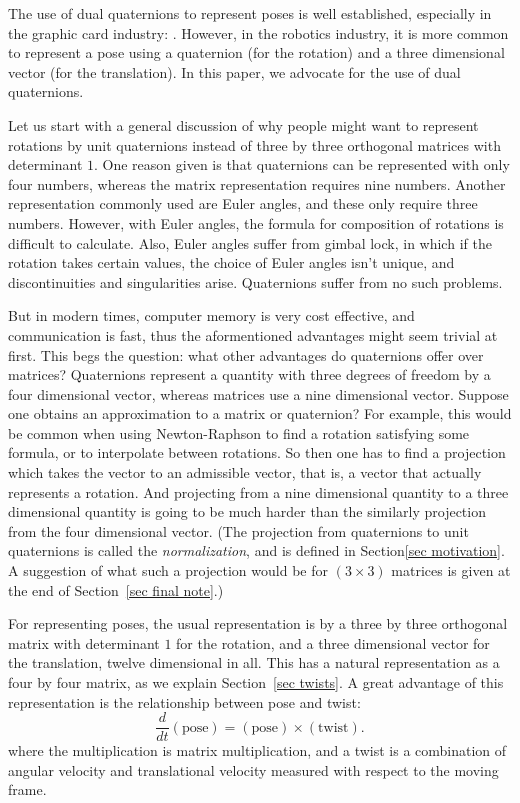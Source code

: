 \documentclass[reqno,12pt]{amsart}
\begin{document}
The use of dual quaternions to represent poses is well established, especially in the graphic card industry: \cite{adorno,han-et-al,clifford,kavan-et-al,kavan-et-al-2,kenwright,wang-et-al}.  However, in the robotics industry, it is more common to represent a pose using a quaternion (for the rotation) and a three dimensional vector (for the translation).  In this paper, we advocate for the use of dual quaternions.

Let us start with a general discussion of why people might want to represent rotations by unit quaternions instead of three by three orthogonal matrices with determinant $1$.  One reason given is that quaternions can be represented with only four numbers, whereas the matrix representation requires nine numbers.  Another representation commonly used are Euler angles, and these only require three numbers.  However, with Euler angles, the formula for composition of rotations is difficult to calculate.  Also, Euler angles suffer from gimbal lock, in which if the rotation takes certain values, the choice of Euler angles isn't unique, and discontinuities and singularities arise.  Quaternions suffer from no such problems.

But in modern times, computer memory is very cost effective, and communication is fast, thus the aformentioned advantages might seem trivial at first.  This begs the question: what other advantages do quaternions offer over matrices?  Quaternions represent a quantity with three degrees of freedom by a four dimensional vector, whereas matrices use a nine dimensional vector.  Suppose one obtains an approximation to a matrix or quaternion?  For example, this would be common when using Newton-Raphson to find a rotation satisfying some formula, or to interpolate between rotations.  So then one has to find a projection which takes the vector to an admissible vector, that is, a vector that actually represents a rotation.  And projecting from a nine dimensional quantity to a three dimensional quantity is going to be much harder than the similarly projection from the four dimensional vector.  (The projection from quaternions to unit quaternions is called the \emph{normalization}, and is defined in Section\ref{sec motivation}.  A suggestion of what such a projection would be for $(3 \times 3)$ matrices is given at the end of Section~\ref{sec final note}.)

For representing poses, the usual representation is by a three by three orthogonal matrix with determinant $1$ for the rotation, and a three dimensional vector for the translation, twelve dimensional in all.  This has a natural representation as a four by four matrix, as we explain Section~\ref{sec twists}.  A great advantage of this representation is the relationship between pose and twist:
\begin{equation}
\label{pose twist}
\frac d{dt} (\text{pose}) = (\text{pose}) \times (\text{twist}).
\end{equation}
where the multiplication is matrix multiplication, and a twist is a combination of angular velocity and translational velocity measured with respect to the moving frame.
\end{document}
